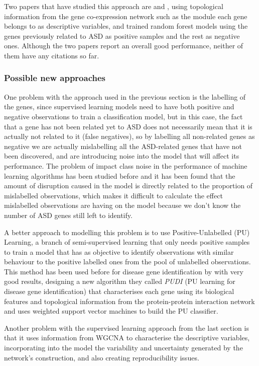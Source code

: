 Two papers that have studied this approach are \cite{brueggeman_forecasting_2018} and \cite{lin_machine_2018}, using topological information from the gene co-expression network such as the module each gene belongs to as descriptive variables, and trained random forest models using the genes previously related to ASD as positive samples and the rest as negative ones. Although the two papers report an overall good performance, neither of them have any citations so far.

\subsubsection{Possible new approaches}
One problem with the approach used in the previous section is the labelling of the genes, since supervised learning models need to have both positive and negative observations to train a classification model, but in this case, the fact that a gene has not been related yet to ASD does not necessarily mean that it is actually not related to it (false negatives), so by labelling all non-related genes as negative we are actually mislabelling all the ASD-related genes that have not been discovered, and are introducing noise into the model that will affect its performance. The problem of impact class noise in the performance of machine learning algorithms has been studied before \cite{nazari_evaluation_2018} and it has been found that the amount of disruption caused in the model is directly related to the proportion of mislabelled observations, which makes it difficult to calculate the effect mislabelled observations are having on the model because we don't know the number of ASD genes still left to identify.

A better approach to modelling this problem is to use Positive-Unlabelled (PU) Learning, a branch of semi-supervised learning that only needs positive samples to train a model that has as objective to identify observations with similar behaviour to the positive labelled ones from the pool of unlabelled observations. This method has been used before for disease gene identification by \cite{yang_positive-unlabeled_2012} with very good results, designing a new algorithm they called \textit{PUDI} (PU learning for disease gene identification) that characterises each gene using its biological features and topological information from the protein-protein interaction network and uses weighted support vector machines to build the PU classifier.

Another problem with the supervised learning approach from the last section is that it uses information from WGCNA to characterise the descriptive variables, incorporating into the model the variability and uncertainty generated by the network's construction, and also creating reproducibility issues.

